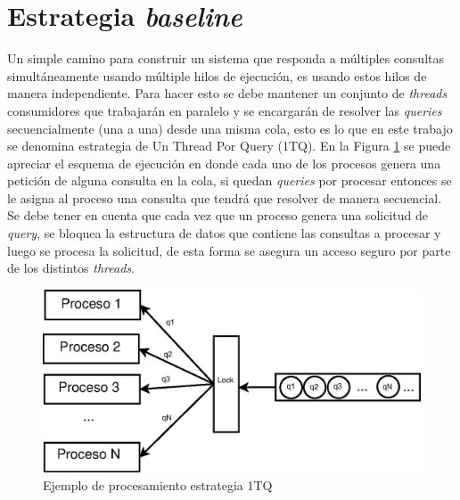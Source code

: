 \section{Estrategia \textit{baseline}}
\label{scheduling:baseline}
Un simple camino para construir un sistema que responda a múltiples consultas simultáneamente usando múltiple hilos de ejecución, es usando estos hilos de manera independiente. Para hacer esto se debe mantener un conjunto de \textit{threads} consumidores que trabajarán en paralelo y se encargarán de resolver las \textit{queries} secuencialmente (una a una) desde una misma cola, esto es lo que en este trabajo se denomina estrategia de Un Thread Por Query (1TQ). En la Figura \ref{fig:1TQ} se puede apreciar el esquema de ejecución en donde cada uno de los procesos genera una petición de alguna consulta en la cola, si quedan \textit{queries} por procesar entonces se le asigna al proceso una consulta que tendrá que resolver de manera secuencial. Se debe tener en cuenta que cada vez que un proceso genera una solicitud de \textit{query}, se bloquea la estructura de datos que contiene las consultas a procesar y luego se procesa la solicitud, de esta forma se asegura un acceso seguro por parte de los distintos \textit{threads}. 

\begin{figure}[H]
\centering
\includegraphics[scale=.75]{images/1TQ.eps}
\caption{Ejemplo de procesamiento estrategia 1TQ}
\label{fig:1TQ}
\end{figure}


